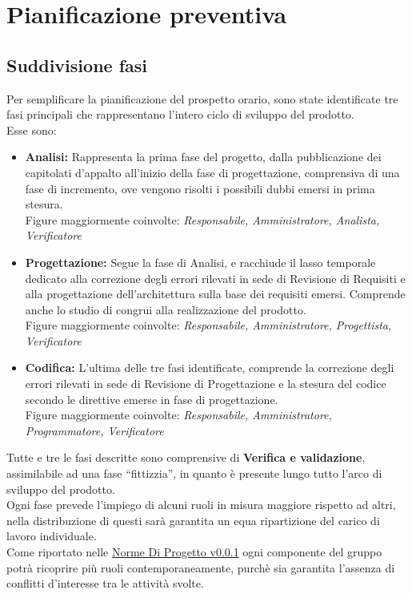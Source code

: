 \documentclass{scalatekids-article}
\begin{document}
\section{Pianificazione preventiva}
\subsection{Suddivisione fasi}
\label{sub:fasi}
Per semplificare la pianificazione del prospetto orario, sono state identificate
tre fasi principali che rappresentano l'intero ciclo di sviluppo del prodotto.\\
Esse sono:
\begin{itemize}
\item\textbf{Analisi:} Rappresenta la prima fase del progetto, dalla
  pubblicazione dei capitolati d'appalto all'inizio della fase di progettazione,
  comprensiva di una fase di incremento, ove vengono risolti i possibili dubbi
  emersi in prima stesura.\\
  Figure maggiormente coinvolte: \textit{Responsabile, Amministratore, Analista, Verificatore}
\item\textbf{Progettazione:} Segue la fase di Analisi, e racchiude il lasso
  temporale dedicato alla correzione degli errori rilevati in sede di Revisione di Requisiti e alla progettazione dell'architettura sulla base dei requisiti
  emersi. Comprende anche lo studio di  congrui alla realizzazione
  del prodotto.\\
  Figure maggiormente coinvolte: \textit{Responsabile, Amministratore, Progettista, Verificatore}
\item\textbf{Codifica:} L'ultima delle tre fasi identificate, comprende la correzione degli errori rilevati in sede di Revisione di Progettazione e la stesura
  del codice secondo le direttive emerse in fase di progettazione.\\
  Figure maggiormente coinvolte: \textit{Responsabile, Amministratore, Programmatore, Verificatore}
\end{itemize}
Tutte e tre le fasi descritte sono comprensive di \textbf{Verifica e
  validazione}, assimilabile ad una fase ``fittizzia'', in quanto è
presente lungo tutto l'arco di sviluppo del prodotto.\\
Ogni fase prevede l'impiego di alcuni ruoli in misura maggiore rispetto ad
altri, nella distribuzione di questi sarà garantita un equa ripartizione del
carico di lavoro individuale.\\
Come riportato nelle \href{run:../Interni/NormeDiProgetto\_v0.0.1.pdf}{Norme Di Progetto v0.0.1}
ogni componente del gruppo potrà ricoprire più ruoli contemporaneamente, purchè sia
garantita l'assenza di conflitti d'interesse tra le attività svolte.
\newpage
\end{document}
